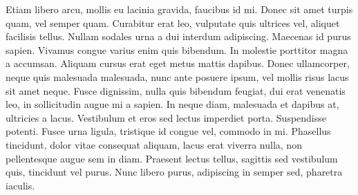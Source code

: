 Etiam libero arcu, mollis eu lacinia gravida, faucibus id mi. Donec sit amet turpis quam, vel semper quam. Curabitur erat leo, vulputate quis ultrices vel, aliquet facilisis tellus. Nullam sodales urna a dui interdum adipiscing. Maecenas id purus sapien. Vivamus congue varius enim quis bibendum. In molestie porttitor magna a accumsan. Aliquam cursus erat eget metus mattis dapibus. Donec ullamcorper, neque quis malesuada malesuada, nunc ante posuere ipsum, vel mollis risus lacus sit amet neque. Fusce dignissim, nulla quis bibendum feugiat, dui erat venenatis leo, in sollicitudin augue mi a sapien. In neque diam, malesuada et dapibus at, ultricies a lacus. Vestibulum et eros sed lectus imperdiet porta. Suspendisse potenti. Fusce urna ligula, tristique id congue vel, commodo in mi. Phasellus tincidunt, dolor vitae consequat aliquam, lacus erat viverra nulla, non pellentesque augue sem in diam. Praesent lectus tellus, sagittis sed vestibulum quis, tincidunt vel purus. Nunc libero purus, adipiscing in semper sed, pharetra iaculis. 
